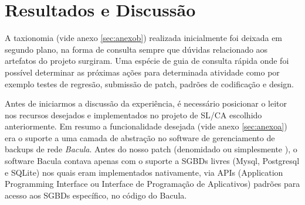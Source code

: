 % 
% 
% 
% 

\section{Resultados e Discussão} \label{sec:resultados} \label{subsec:sobre}

A taxionomia (vide anexo \ref{sec:anexob}) realizada inicialmente foi deixada em segundo plano, na forma de consulta sempre que dúvidas relacionado aos artefatos do projeto surgiram. Uma espécie de guia de consulta rápida onde foi possível determinar as próximas ações para determinada atividade como por exemplo testes de regresão, submissão de patch, padrões de codificação e design.

Antes de iniciarmos a discussão da experiência, é necessário posicionar o leitor nos recursos desejados e implementados no projeto de SL/CA escolhido anteriormente. Em resumo a funcionalidade desejada (vide anexo \ref{sec:anexoa}) era o suporte a uma camada de abstração no software de gerenciamento de backups de rede \textit{Bacula}. Antes do nosso patch (denomidado \patch ou simplesmente \patchshort), o software Bacula contava apenas com o suporte a SGBDs livres (Mysql, Postgresql e SQLite) nos quais eram implementados nativamente, via APIs (Application Programming Interface ou Interface de Programação de Aplicativos) padrões para acesso aos SGBDs específico, no código do Bacula. 

